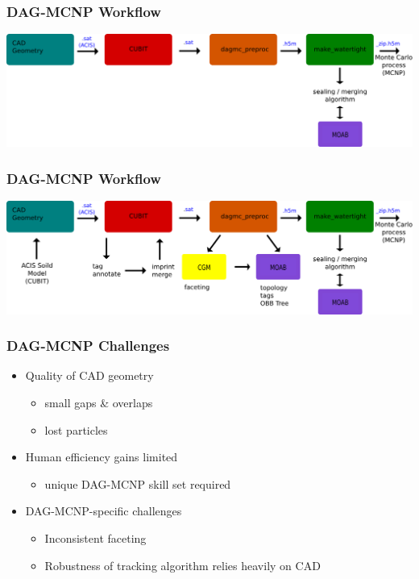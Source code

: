 \documentclass[14pt]{beamer}
\begin{document}
\begin{frame}
\frametitle{DAG-MCNP Workflow}
\begin{center}
\includegraphics[scale=0.23, trim = 40 200 0 0]{DAGMC_Wrkflw5.png}
\end{center}
\end{frame}

\begin{frame}
\frametitle{DAG-MCNP Workflow}
\begin{center}
\includegraphics[scale=0.23, trim = 40 200 0 0]{DAGMC_Wrkflw6.png}
\end{center}
\end{frame}


\begin{frame}
\frametitle{DAG-MCNP Challenges}
\begin{itemize}
\vfill
\item Quality of CAD geometry
	\begin{itemize}
	\item small gaps \& overlaps
	\item lost particles
	\end{itemize}
\vfill
\item Human efficiency gains limited
	\begin{itemize}
	\item unique DAG-MCNP skill set required
	\end{itemize}
\vfill
\item DAG-MCNP-specific challenges
	\begin{itemize}
	\item Inconsistent faceting
	\item Robustness of tracking algorithm relies heavily on CAD
	\end{itemize}
\end{itemize}
\end{frame}
\end{document}
